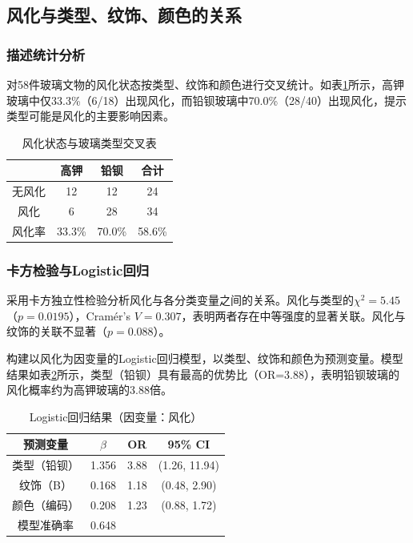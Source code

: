 \documentclass[fontset=windows, 12pt, a4paper]{ctexart}
\begin{document}
\subsection{风化与类型、纹饰、颜色的关系}

\subsubsection{描述统计分析}

对58件玻璃文物的风化状态按类型、纹饰和颜色进行交叉统计。如表\ref{tab:weather_type}所示，高钾玻璃中仅33.3\%（6/18）出现风化，而铅钡玻璃中70.0\%（28/40）出现风化，提示类型可能是风化的主要影响因素。

\begin{table}[H]
\centering
\caption{风化状态与玻璃类型交叉表}
\label{tab:weather_type}
\begin{tabular}{c|cc|c}
\toprule
& \textbf{高钾} & \textbf{铅钡} & \textbf{合计} \\
\midrule
无风化 & 12 & 12 & 24 \\
风化   & 6  & 28 & 34 \\
\midrule
风化率  & 33.3\% & 70.0\% & 58.6\% \\
\bottomrule
\end{tabular}
\end{table}

\subsubsection{卡方检验与Logistic回归}

采用卡方独立性检验分析风化与各分类变量之间的关系。风化与类型的$\chi^2=5.45$（$p=0.0195$），Cram\'er's $V=0.307$，表明两者存在中等强度的显著关联。风化与纹饰的关联不显著（$p=0.088$）。

构建以风化为因变量的Logistic回归模型，以类型、纹饰和颜色为预测变量。模型结果如表\ref{tab:logistic}所示，类型（铅钡）具有最高的优势比（OR=3.88），表明铅钡玻璃的风化概率约为高钾玻璃的3.88倍。

\begin{table}[H]
\centering
\caption{Logistic回归结果（因变量：风化）}
\label{tab:logistic}
\begin{tabular}{c|c|c|c}
\toprule
\textbf{预测变量} & $\beta$ & \textbf{OR} & \textbf{95\% CI} \\
\midrule
类型（铅钡） & 1.356 & 3.88 & (1.26, 11.94) \\
纹饰（B）    & 0.168 & 1.18 & (0.48, 2.90) \\
颜色（编码）  & 0.208 & 1.23 & (0.88, 1.72) \\
\midrule
模型准确率 & 0.648 & & \\
\bottomrule
\end{tabular}
\end{table}
\end{document}
